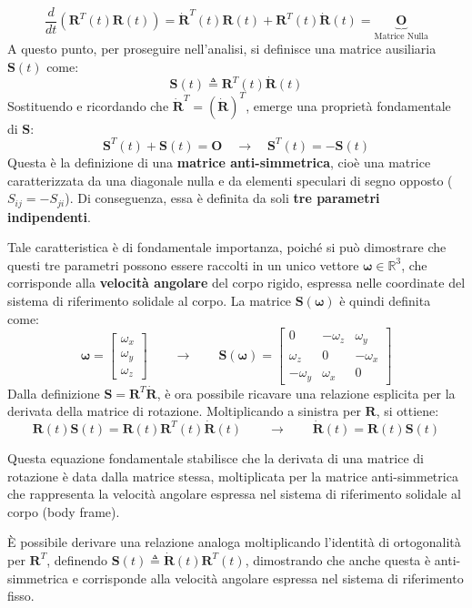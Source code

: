 ﻿\documentclass[11pt, a4paper]{article}
\begin{document}
\[
    \frac{d}{dt} \left( \bm{R}^T(t) \bm{R}(t) \right) = \dot{\bm{R}}^T(t) \bm{R}(t) + \bm{R}^T(t) \dot{\bm{R}}(t) = \underbrace{\bm{O}}_{\text{Matrice Nulla}}
\]
A questo punto, per proseguire nell'analisi, si definisce una matrice ausiliaria \(\bm{S}(t)\) come:
\[
    \bm{S}(t) \triangleq \bm{R}^T(t) \dot{\bm{R}}(t)
\]
Sostituendo e ricordando che \(\dot{\bm{R}}^T = (\dot{\bm{R}})^T\), emerge una proprietà fondamentale di \(\bm{S}\):
\[
    \bm{S}^T(t) + \bm{S}(t) = \bm{O} \quad \longrightarrow \quad \bm{S}^T(t) = -\bm{S}(t)
\]
Questa è la definizione di una \textbf{matrice anti-simmetrica}, cioè una matrice caratterizzata da una diagonale nulla e da elementi speculari di segno opposto (\(S_{ij} = -S_{ji}\)). Di conseguenza, essa è definita da soli \textbf{tre parametri indipendenti}.

Tale caratteristica è di fondamentale importanza, poiché si può dimostrare che questi tre parametri possono essere raccolti in un unico vettore \(\bm{\omega} \in \mathbb{R}^3\), che corrisponde alla \textbf{velocità angolare} del corpo rigido, espressa nelle coordinate del sistema di riferimento solidale al corpo. La matrice \(\bm{S}(\bm{\omega})\) è quindi definita come:
\[
    \bm{\omega} = \begin{bmatrix} \omega_x \\ \omega_y \\ \omega_z \end{bmatrix}
    \qquad \longrightarrow \qquad
    \bm{S}(\bm{\omega}) = \begin{bmatrix}
        0 & -\omega_z & \omega_y \\
        \omega_z & 0 & -\omega_x \\
        -\omega_y & \omega_x & 0
    \end{bmatrix}
\]
Dalla definizione \(\bm{S} = \bm{R}^T \dot{\bm{R}}\), è ora possibile ricavare una relazione esplicita per la derivata della matrice di rotazione. Moltiplicando a sinistra per \(\bm{R}\), si ottiene:
\[
    \bm{R}(t) \bm{S}(t) = \bm{R}(t) \bm{R}^T(t) \dot{\bm{R}}(t) \qquad \longrightarrow \qquad \dot{\bm{R}}(t) = \bm{R}(t) \bm{S}(t)
\]

Questa equazione fondamentale stabilisce che la derivata di una matrice di rotazione è data dalla matrice stessa, moltiplicata per la matrice anti-simmetrica che rappresenta la velocità angolare espressa nel sistema di riferimento solidale al corpo (body frame).

È possibile derivare una relazione analoga moltiplicando l'identità di ortogonalità per \(\bm{R}^T\), definendo \(\bm{S}(t) \triangleq \dot{\bm{R}}(t) \bm{R}^T(t)\), dimostrando che anche questa è anti-simmetrica e corrisponde alla velocità angolare espressa nel sistema di riferimento fisso.
\end{document}
